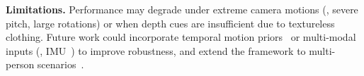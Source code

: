 \documentclass[runningheads]{llncs}
\begin{document}
\noindent\textbf{Limitations.}
Performance may degrade under extreme camera motions (\eg, severe pitch, large rotations) or when depth cues are insufficient due to textureless clothing. Future work could incorporate temporal motion priors~\cite{MDM2023,PhysDiff2023} or multi-modal inputs (\eg, IMU~\cite{WHAM2024}) to improve robustness, and extend the framework to multi-person scenarios~\cite{MultiHMR2024}.






\end{document}
